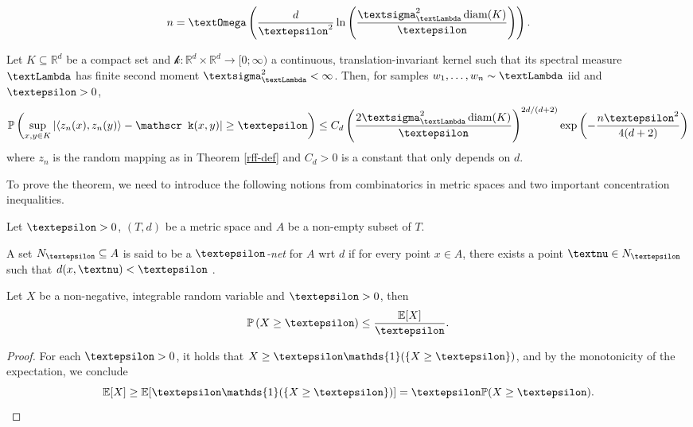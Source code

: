 \documentclass[openany]{book}
\begin{document}
\begin{equation*}
    n=\gOmega\left(\frac{d}{\gepsilon^2}\ln\left(\frac{\gsigma_{\gLambda}^2\diam(K)}{\gepsilon}\right)\right).
\end{equation*}
\begin{theorem}\label{unif-conv-rff}
Let $K\subseteq \mathbb R^d$ be a compact set and $\mathscr k:\mathbb R^d\times \mathbb R^d\to [0;\infty)$ a continuous, translation-invariant kernel such that its spectral measure $\gLambda$ has finite second moment $\gsigma_{\gLambda}^2<\infty$. Then, for samples $w_1,\dots,w_n\sim\gLambda$ iid and $\gepsilon>0$, 
\begin{equation*}
    \mathbb P\left(\sup_{x,y\in K}\left\vert \langle z_{n}(x), z_{n}(y)\rangle -\mathscr k(x,y) \right\vert \geq \gepsilon\right)\leq C_d  \left(\frac{2\gsigma_{\gLambda}^2\diam(K)}{\gepsilon}\right)^{2d/(d+2)}\exp\left(-\frac{n\gepsilon^2}{4(d+2)}\right)
\end{equation*}
where $z_{n}$ is the random mapping as in Theorem \ref{rff-def} and $C_d>0$ is a constant that only depends on $d$.
\end{theorem}
To prove the theorem, we need to introduce the following notions from combinatorics in metric spaces and two important concentration inequalities.
\begin{definition}
    Let $\gepsilon>0$, $(T,d)$ be a metric space and $A$ be a non-empty subset of $T$.
    \par A set $N_{\gepsilon}\subseteq A$ is said to be a $\gepsilon$\textit{-net} for $A$ wrt $d$ if for every point $x\in A$, there exists a point $\gnu\in N_{\gepsilon}$ such that $d(x,\gnu)<\gepsilon$ \cite{clements1963}.
\end{definition}
\begin{theorem}
    Let $X$ be a non-negative, integrable random variable and $\gepsilon>0$, then
    \begin{equation*}\label{markovs_ineq}
        \mathbb P\left(X\geq \gepsilon\right)\leq \frac{\mathbb E[X]}{\gepsilon}.
    \end{equation*}
    \begin{proof}
       For each $\gepsilon>0$, it holds that $ X\geq \gepsilon\mathds{1}(\{X\geq \gepsilon\})$, and by the monotonicity of the expectation, we conclude
       \begin{equation*}
           \mathbb E[X]\geq \mathbb E[\gepsilon\mathds{1}(\{X\geq \gepsilon\})]=\gepsilon\mathbb P(X\geq \gepsilon).\qedhere
       \end{equation*}
    \end{proof}
\end{theorem}
\end{document}
